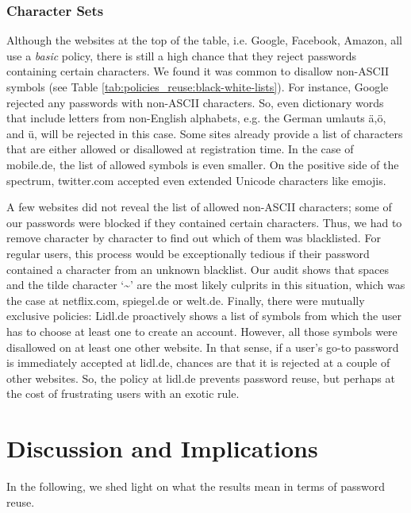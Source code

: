 \subsubsection{Character Sets}
Although the websites at the top of the table, i.e. Google, Facebook, Amazon, all use a \textit{basic} policy, there is still a high chance that they reject passwords containing certain characters. We found it was common to disallow non-ASCII symbols (see Table \ref{tab:policies_reuse:black-white-lists}). For instance, Google rejected any passwords with non-ASCII characters. So, even dictionary words that include letters from non-English alphabets, e.g. the German umlauts ä,ö, and ü, will be rejected in this case. Some sites already provide a list of characters that are either allowed or disallowed at registration time. In the case of mobile.de, the list of allowed symbols is even smaller. On the positive side of the spectrum, twitter.com accepted even extended Unicode characters like emojis. 

A few websites did not reveal the list of allowed non-ASCII characters; some of our passwords were blocked if they contained certain characters. Thus, we had to remove character by character to find out which of them was blacklisted. For regular users, this process would be exceptionally tedious if their password contained a character from an unknown blacklist. Our audit shows that spaces and the tilde character `\textasciitilde' are the most likely culprits in this situation, which was the case at netflix.com, spiegel.de or welt.de. Finally, there were mutually exclusive policies: Lidl.de proactively shows a list of symbols from which the user has to choose at least one to create an account. However, all those symbols were disallowed on at least one other website. In that sense, if a user's go-to password is immediately accepted at lidl.de, chances are that it is rejected at a couple of other websites. So, the policy at lidl.de prevents password reuse, but perhaps at the cost of frustrating users with an exotic rule. 



\section{Discussion and Implications}
In the following, we shed light on what the results mean in terms of password reuse. 
